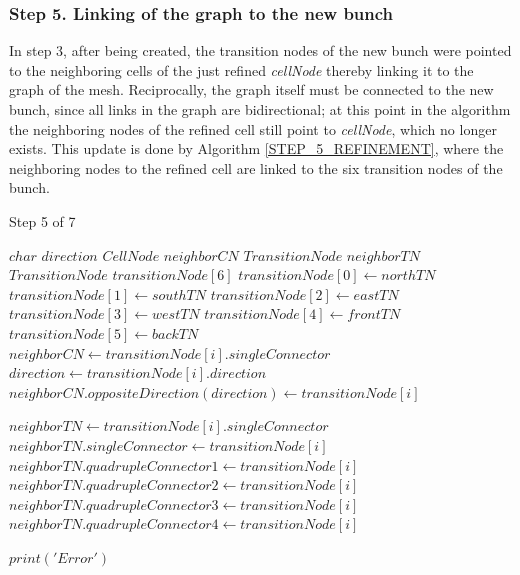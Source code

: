 \subsubsection*{Step 5. Linking of the graph to the new bunch}
In step 3, after being created, the transition nodes of the new
bunch were pointed to the neighboring cells of the just refined
\textit{cellNode} thereby linking it to the graph of the mesh.
Reciprocally, the graph itself must be connected to the new bunch,
since all links in the graph are bidirectional; at this point in the
algorithm the neighboring nodes of the refined cell still point to
\textit{cellNode}, which no longer exists. This update is done by
Algorithm \ref{STEP_5_REFINEMENT}, where the neighboring nodes to
the refined cell are linked to the six transition nodes of the
bunch.

\begin{algorithm}[!hb]
    \caption{Step 5 of 7}
    \small{
    \begin{algorithmic}[1]
        \State $char$ $direction$
        \State $CellNode$  $neighborCN$
        \State $TransitionNode$  $neighborTN$
        \State $TransitionNode$ $transitionNode[6]$
        \State $transitionNode[0] \gets northTN$
        \State $transitionNode[1] \gets southTN$
        \State $transitionNode[2] \gets eastTN$
        \State $transitionNode[3] \gets westTN$
        \State $transitionNode[4] \gets frontTN$
        \State $transitionNode[5] \gets backTN$
        \State
                \State $neighborCN \gets transitionNode[i].singleConnector$
                \State $direction \gets transitionNode[i].direction$
                \State $neighborCN.oppositeDirection(direction) \gets transitionNode[i]$

            \Else {}
                \State $neighborTN \gets transitionNode[i].singleConnector$
                    \State $neighborTN.singleConnector \gets transitionNode[i]$
                    \State
                    \State $neighborTN.quadrupleConnector1 \gets transitionNode[i]$
                    \State
                    \State $neighborTN.quadrupleConnector2 \gets transitionNode[i]$
                    \State
                    \State $neighborTN.quadrupleConnector3 \gets transitionNode[i]$
                    \State
                    \State $neighborTN.quadrupleConnector4 \gets transitionNode[i]$

                \Else
                    \State $print('Error')$
                \EndIf
            \EndIf
        \EndFor
    \end{algorithmic}
    }
    \label{STEP_5_REFINEMENT}
\end{algorithm}

